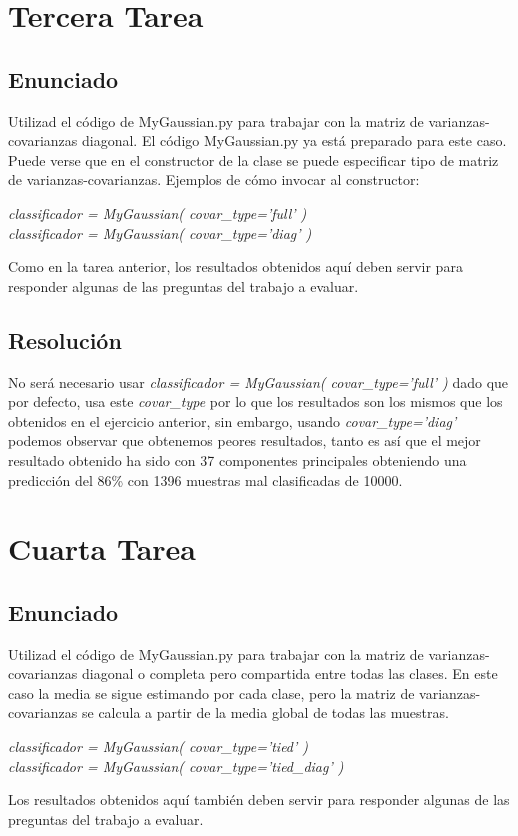 \documentclass[12pt,twoside]{article}
\begin{document}
\section{Tercera Tarea}

\subsection{Enunciado}
\noindent
Utilizad el código de MyGaussian.py para trabajar con la matriz de varianzas-covarianzas diagonal. El código MyGaussian.py ya está preparado para este caso.
Puede verse que en el constructor de la clase se puede especificar tipo de matriz de varianzas-covarianzas. Ejemplos de cómo invocar al constructor:
\begin{center}
\textit{classificador = MyGaussian( covar\_type='full' )}\\
\textit{classificador = MyGaussian( covar\_type='diag' )}
\end{center}
Como en la tarea anterior, los resultados obtenidos aquí deben servir para responder algunas de las preguntas del trabajo a evaluar.

\subsection{Resolución}
No será necesario usar \textit{classificador = MyGaussian( covar\_type='full' )} dado que por defecto, usa este \textit{covar\_type} por lo que los resultados son los mismos que los obtenidos en el ejercicio anterior, sin embargo, usando \textit{covar\_type='diag'} podemos observar que obtenemos peores resultados, tanto es así que el mejor resultado obtenido ha sido con 37 componentes principales obteniendo una predicción del 86\% con 1396 muestras mal clasificadas de 10000.


\section{Cuarta Tarea}

\subsection{Enunciado}

Utilizad el código de MyGaussian.py para trabajar con la matriz de varianzas-covarianzas diagonal o completa pero compartida entre todas las clases. En este caso la media se sigue estimando por cada clase, pero la matriz de varianzas-covarianzas se calcula a partir de la media global de todas las muestras.
\begin{center}
\textit{classificador = MyGaussian( covar\_type='tied' )}\\
\textit{classificador = MyGaussian( covar\_type='tied\_diag' )}
\end{center}
Los resultados obtenidos aquí también deben servir para responder algunas de las preguntas del trabajo a evaluar.
\end{document}
